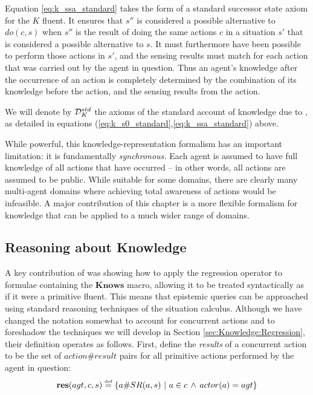Equation \eqref{eq:k_ssa_standard} takes the form of a standard successor
state axiom for the $K$ fluent. It ensures that $s''$ is considered
a possible alternative to $do(c,s)$ when $s''$ is the result of
doing the same actions $c$ in a situation $s'$ that is considered
a possible alternative to $s$. It must furthermore have been possible
to perform those actions in $s'$, and the sensing results must match
for each action that was carried out by the agent in question. Thus
an agent's knowledge after the occurrence of an action is completely
determined by the combination of its knowledge before the action,
and the sensing results from the action.

\medskip{}

\begin{defn}
We will denote by $\mathcal{D}_{K}^{std}$ the axioms of the standard account
of knowledge due to \citep{scherl03sc_knowledge,scherl03conc_knowledge},
as detailed in equations (\ref{eq:k_s0_standard},\ref{eq:k_ssa_standard})
above. 
\end{defn}
While powerful, this knowledge-representation formalism has an important
limitation: it is fundamentally \emph{synchronous.} Each agent is
assumed to have full knowledge of all actions that have occurred --
in other words, all actions are assumed to be public. While suitable
for some domains, there are clearly many multi-agent domains where
achieving total awareness of actions would be infeasible. A major
contribution of this chapter is a more flexible formalism for knowledge
that can be applied to a much wider range of domains.


\subsection{Reasoning about Knowledge}

A key contribution of \citet{scherl03sc_knowledge} was showing how
to apply the regression operator to formulae containing the $\mathbf{Knows}$
macro, allowing it to be treated syntactically as if it were a primitive
fluent. This means that epistemic queries can be approached using
standard reasoning techniques of the situation calculus. Although
we have changed the notation somewhat to account for concurrent actions
and to foreshadow the techniques we will develop in Section \ref{sec:Knowledge:Regression},
their definition operates as follows. First, define the \emph{results}
of a concurrent action to be the set of $action\#result$ pairs for
all primitive actions performed by the agent in question:\[
\mathbf{res}(agt,c,s)\stackrel{\mbox{\tiny def}}{=}\{a\#SR(a,s)\,\,|\,\, a\in c\,\wedge\, actor(a)=agt\}\]



